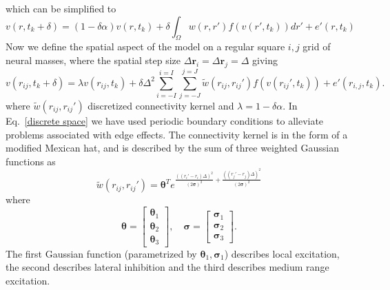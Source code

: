 \documentclass[onecolumn,draftcls]{IEEEtran}
\begin{document}
which can be simplified to
\begin{equation}\label{discrete time model2}
	v\left(r,t_k + \delta \right) =  (1 - \delta \alpha) v(r,t_k) + \delta \int_\Omega  {w\left( r,r' \right)f\left( {v\left( r',t_k \right)} \right)dr'} + e'(r,t_k)
\end{equation}
Now we define the spatial aspect of the model on a regular square $i,j$ grid of neural masses, where the spatial step size $\Delta \mathbf{r}_i = \Delta \mathbf{r}_j = \Delta $ giving
\begin{equation}\label{discrete space}
	v\left(r_{ij},t_k + \delta \right) =  \lambda v(r_{ij},t_k) + \delta \Delta^2 \sum_{i=-I}^{i=I}{\sum_{j=-J}^{j=J}{\tilde{w}\left( r_{ij},r_{ij}' \right)f\left( v\left( r_{ij}',t_k \right) \right)} }+ e'(r_{i,j},t_k).
\end{equation}
where $\tilde{w}(r_{ij},r_{ij}')$ discretized connectivity kernel and $\lambda = 1 - \delta \alpha$. In Eq.~\ref{discrete space} we have used periodic boundary conditions to alleviate problems associated with edge effects. The connectivity kernel is in the form of a modified Mexican hat, and is described by the sum of three weighted Gaussian functions as
\begin{equation}
	\tilde{w}(r_{ij},r_{ij}') = \mathbf{\theta}^T e^{\frac{\left(\left(r_i'-r_i\right)\Delta\right)^2}{(2\mathbf{\sigma})^2} + \frac{\left(\left(r_j'-r_j\right)\Delta\right)^2}{(2\mathbf{\sigma})^2}}
\end{equation}
where
\begin{equation}
 \mathbf{\theta}=\begin{bmatrix} \mathbf{\theta}_{1}\\\mathbf{\theta}_{2}\\\mathbf \theta_{3}\end{bmatrix},\quad \mathbf{\sigma}=\begin{bmatrix}\mathbf{\sigma}_1\\\mathbf{\sigma}_2\\ \mathbf{\sigma}_3\end{bmatrix}.
\end{equation}
The first Gaussian function (parametrized by $\mathbf{\theta}_1, \mathbf{\sigma}_1$) describes local excitation, the second describes lateral inhibition and the third describes medium range excitation. 
 
\end{document}
